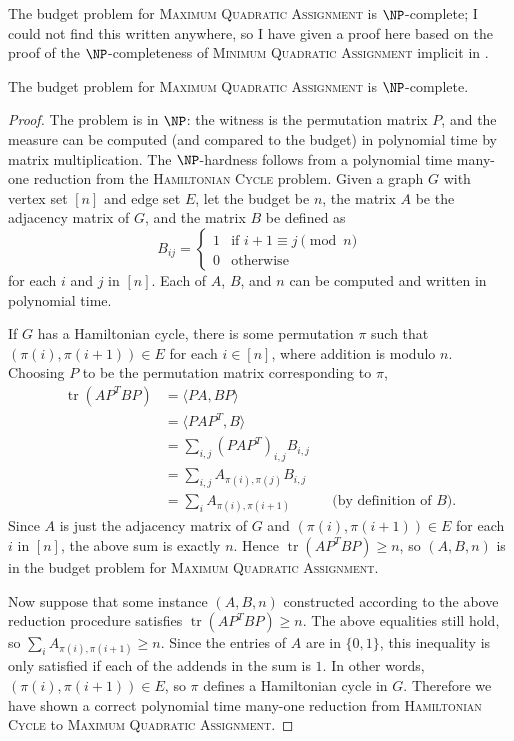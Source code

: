 \documentclass{article}
\newcommand{\1}{\mathbf{1}}
\newcommand{\MQA}{\textsc{Maximum Quadratic Assignment}}
\DeclareMathOperator{\tr}{tr}
\begin{document}
The budget problem for \MQA{} is $\NP$-complete; I could not find this written anywhere, so I have given a proof here based on the proof of the $\NP$-completeness of \textsc{Minimum Quadratic Assignment} implicit in \autocite{sg76}.
\begin{theorem}
  The budget problem for \MQA{} is $\NP$-complete.
\end{theorem}
\begin{proof}
  The problem is in $\NP$: the witness is the permutation matrix $P$, and the measure can be computed (and compared to the budget) in polynomial time by matrix multiplication.
  The $\NP$-hardness follows from a polynomial time many-one reduction from the \textsc{Hamiltonian Cycle} problem.
  Given a graph $G$ with vertex set $[n]$ and edge set $E$, let the budget be $n$, the matrix $A$ be the adjacency matrix of $G$, and the matrix $B$ be defined as
  \begin{equation*}
    B_{ij} =
    \begin{cases}
      1 & \text{if } i + 1 \equiv j \pmod{n} \\
      0 & \text{otherwise}
    \end{cases}
  \end{equation*}
  for each $i$ and $j$ in $[n]$.
  Each of $A$, $B$, and $n$ can be computed and written in polynomial time.

  If $G$ has a Hamiltonian cycle, there is some permutation $\pi$ such that $(\pi(i), \pi(i + 1)) \in E$ for each $i \in [n]$, where addition is modulo $n$.
  Choosing $P$ to be the permutation matrix corresponding to $\pi$,
  \begin{align*}
    \tr(AP^TBP) & = \langle PA, BP \rangle  \\
    & = \langle PAP^T, B \rangle \\
    & = \sum_{i, j} (PAP^T)_{i, j} B_{i, j} \\
    & = \sum_{i, j} A_{\pi(i), \pi(j)} B_{i, j} \\
    & = \sum_{i} A_{\pi(i), \pi(i + 1)} && \text{(by definition of } B \text{)}.
  \end{align*}
  Since $A$ is just the adjacency matrix of $G$ and $(\pi(i), \pi(i + 1)) \in E$ for each $i$ in $[n]$, the above sum is exactly $n$.
  Hence $\tr(AP^TBP) \geq n$, so $(A, B, n)$ is in the budget problem for \MQA{}.

  Now suppose that some instance $(A, B, n)$ constructed according to the above reduction procedure satisfies $\tr(AP^TBP) \geq n$.
  The above equalities still hold, so $\sum_{i} A_{\pi(i), \pi(i + 1)} \geq n$.
  Since the entries of $A$ are in $\{0, 1\}$, this inequality is only satisfied if each of the addends in the sum is $1$.
  In other words, $(\pi(i), \pi(i + 1)) \in E$, so $\pi$ defines a Hamiltonian cycle in $G$.
  Therefore we have shown a correct polynomial time many-one reduction from \textsc{Hamiltonian Cycle} to \MQA{}.
\end{proof}
\end{document}
